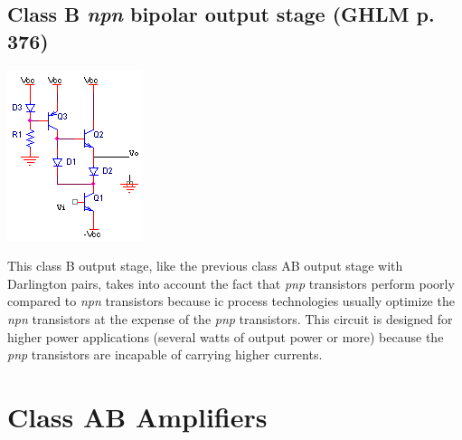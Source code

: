 \subsection{Class B \textit{npn} bipolar output stage (GHLM p. 376)}
\begin{center}
	\includegraphics{schematics/npnClassBoutput.PNG}
\end{center}
This class B output stage, like the previous class AB output stage with Darlington pairs, takes into account the fact that \textit{pnp} transistors perform poorly compared to \textit{npn} transistors because \ac{ic} process technologies usually optimize the \textit{npn} transistors at the expense of the \textit{pnp} transistors.
This circuit is designed for higher power applications (several watts of output power or more) because the \textit{pnp} transistors are incapable of carrying higher currents.


\section{Class AB Amplifiers}

